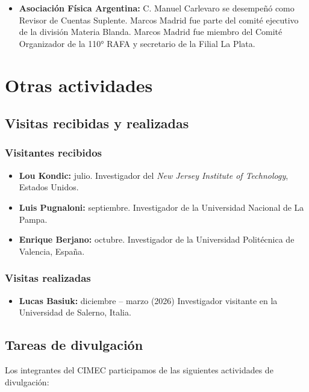 \documentclass[a4paper,11pt,twoside,final,titlepage,onecolumn,openright]{report}
\begin{document}
\begin{itemize}
	\item \textbf{Asociación Física Argentina:} C. Manuel Carlevaro se desempeñó como Revisor de Cuentas Suplente. Marcos Madrid fue parte del comité ejecutivo de la división Materia Blanda. Marcos Madrid fue miembro del Comité Organizador de la 110° RAFA y secretario de la Filial La Plata.

\end{itemize}


\section{Otras actividades}

\subsection{Visitas recibidas y realizadas}

\subsubsection{Visitantes recibidos}

\begin{itemize}
	\item \textbf{Lou Kondic:} julio. Investigador del \textit{New Jersey Institute of Technology}, Estados Unidos.
	\item {\bf Luis Pugnaloni:} septiembre. Investigador de la Universidad Nacional de La Pampa.
	\item \textbf{Enrique Berjano:} octubre. Investigador de la Universidad Politécnica de Valencia, España.
\end{itemize}

\subsubsection{Visitas realizadas}

\begin{itemize}
	\item \textbf{Lucas Basiuk:} diciembre -- marzo (2026) Investigador visitante en la Universidad de Salerno, Italia.
\end{itemize}


\subsection{Tareas de divulgación}
Los integrantes del CIMEC participamos de las siguientes actividades de divulgación:
\end{document}
